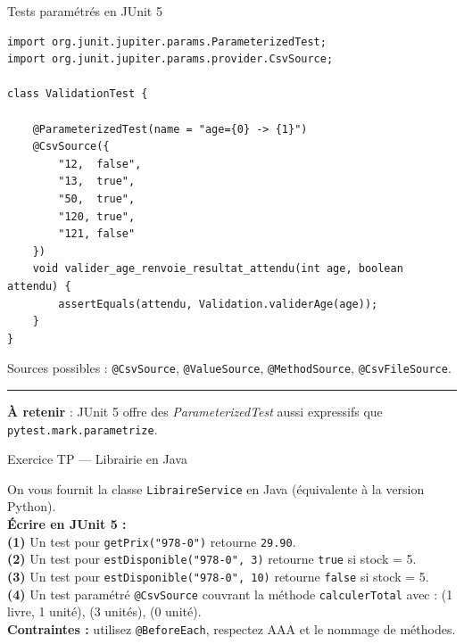 \documentclass[aspectratio=169,11pt]{beamer}
\newcommand{\takeaway}[1]{%
\vfill\begin{beamercolorbox}[wd=\linewidth,sep=0.4em]{}
\color{accent2}\rule[0.6ex]{1.2em}{1.2pt}\hspace{0.4em}%
\textbf{\color{accent2}\small À retenir} \textcolor{textsoft}{:} %
{\small\color{textmain}#1}
\end{beamercolorbox}}
\begin{document}
\begin{frame}[fragile,t,shrink=18]{Tests paramétrés en JUnit 5}
\begin{lstlisting}[style=javadark]
import org.junit.jupiter.params.ParameterizedTest;
import org.junit.jupiter.params.provider.CsvSource;

class ValidationTest {

    @ParameterizedTest(name = "age={0} -> {1}")
    @CsvSource({
        "12,  false",
        "13,  true",
        "50,  true",
        "120, true",
        "121, false"
    })
    void valider_age_renvoie_resultat_attendu(int age, boolean attendu) {
        assertEquals(attendu, Validation.validerAge(age));
    }
}
\end{lstlisting}
\vspace{0.3cm}
\footnotesize
Sources possibles : \texttt{@CsvSource}, \texttt{@ValueSource}, \texttt{@MethodSource}, \texttt{@CsvFileSource}.
\takeaway{JUnit 5 offre des \emph{ParameterizedTest} aussi expressifs que \texttt{pytest.mark.parametrize}.}
\end{frame}

\begin{frame}[fragile,t]{Exercice TP --- Librairie en Java}
\begin{exercice}
On vous fournit la classe \texttt{LibraireService} en Java (équivalente à la version Python).\\[0.4em]
\textbf{Écrire en JUnit 5 :}\\[0.2em]
\textbf{(1)} Un test pour \texttt{getPrix("978-0")} retourne \texttt{29.90}.\\
\textbf{(2)} Un test pour \texttt{estDisponible("978-0", 3)} retourne \texttt{true} si stock = 5.\\
\textbf{(3)} Un test pour \texttt{estDisponible("978-0", 10)} retourne \texttt{false} si stock = 5.\\
\textbf{(4)} Un test paramétré \texttt{@CsvSource} couvrant la méthode \texttt{calculerTotal} avec : (1 livre, 1 unité), (3 unités), (0 unité).\\[0.3em]
\textbf{Contraintes :} utilisez \texttt{@BeforeEach}, respectez AAA et le nommage de méthodes.
\end{exercice}
\end{frame}
\end{document}
